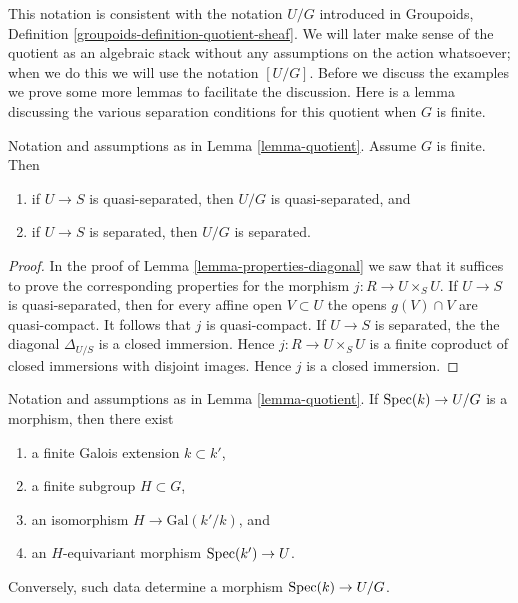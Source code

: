 \noindent
This notation is consistent with the notation $U/G$ introduced in
Groupoids, Definition \ref{groupoids-definition-quotient-sheaf}.
We will later make sense of the quotient as an algebraic stack without
any assumptions on the action whatsoever; when we do this we will use the
notation $[U/G]$. Before we discuss the examples we prove
some more lemmas to facilitate the discussion. Here is a lemma discussing the
various separation conditions for this quotient when $G$ is finite.

\begin{lemma}
\label{lemma-quotient-finite-separated}
Notation and assumptions as in Lemma \ref{lemma-quotient}.
Assume $G$ is finite. Then
\begin{enumerate}
\item if $U \to S$ is quasi-separated, then $U/G$ is quasi-separated, and
\item if $U \to S$ is separated, then $U/G$ is separated.
\end{enumerate}
\end{lemma}

\begin{proof}
In the proof of Lemma \ref{lemma-properties-diagonal}
we saw that it suffices to prove the
corresponding properties for the morphism $j : R \to U \times_S U$.
If $U \to S$ is quasi-separated, then for every affine open $V \subset U$
the opens $g(V) \cap V$ are quasi-compact. It follows that $j$ is
quasi-compact.
If $U \to S$ is separated, the the diagonal $\Delta_{U/S}$ is a closed
immersion. Hence $j : R \to U \times_S U$ is a finite coproduct
of closed immersions with disjoint images. Hence $j$ is a closed immersion.
\end{proof}

\begin{lemma}
\label{lemma-quotient-field-map}
Notation and assumptions as in Lemma \ref{lemma-quotient}.
If $\mathop{\rm Spec}(k) \to U/G$ is a morphism, then there exist
\begin{enumerate}
\item a finite Galois extension $k \subset k'$,
\item a finite subgroup $H \subset G$,
\item an isomorphism $H \to \text{Gal}(k'/k)$, and
\item an $H$-equivariant morphism $\mathop{\rm Spec}(k') \to U$.
\end{enumerate}
Conversely, such data determine a morphism $\mathop{\rm Spec}(k) \to U/G$.
\end{lemma}

